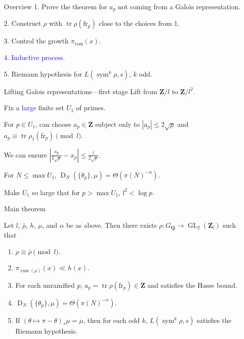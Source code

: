 \documentclass{beamer}
\DeclareMathOperator{\D}{D}
\DeclareMathOperator{\GL}{GL}
\DeclareMathOperator{\ram}{ram}
\DeclareMathOperator{\sym}{sym}
\DeclareMathOperator{\tr}{tr}
\newcommand{\bQ}{\mathbf{Q}}
\newcommand{\bZ}{\mathbf{Z}}
\newcommand{\frob}{\mathrm{fr}}
\begin{document}
\begin{frame}{Overview}
\color{shade}
1. Prove the theorem for $a_p$ not coming from a Galois representation.

2. Construct $\rho$ with $\tr\rho(\frob_p)$ close to the choices from 1.

3. Control the growth $\pi_{\ram}(x)$. 

\textcolor{blue}{
4. Inductive process.}

5. Riemann hypothesis for $L(\sym^k\rho,s)$, $k$ odd.
\end{frame}



\begin{frame}{Lifting Galois representations---first stage}
Lift from $\bZ/l$ to $\bZ/l^2$. 
\pause

Fix a \textcolor{blue}{large} finite set $U_1$ of primes. 
\pause

For $p\in U_1$, can choose $a_p\in \bZ$ subject only to 
$|a_p|\leqslant 2\sqrt p$ and $a_p\equiv \tr\rho_1(\frob_p)\pmod{l}$. 
\pause

We can ensure 
$\left| \frac{a_p}{2\sqrt p} - x_p\right| \leqslant \frac{l}{2\sqrt p}$.
\pause

For $N\leqslant \max U_1$, $\D_N(\{\theta_p\},\mu) = \Theta(\pi(N)^{-\alpha})$. 
\pause

Make $U_1$ so large that for $p>\max U_1$, $l^2 < \log p$. 
\end{frame}



\begin{frame}{Main theorem}
\begin{theorem}[M.]
Let $l$, $\bar\rho$, $h$, $\mu$, and $\alpha$ be as above. Then there exists 
$\rho\colon G_\bQ \to \GL_2(\bZ_l)$ such that 
\begin{enumerate}
\item
$\rho \equiv \bar\rho\pmod{l}$. 

\item
$\pi_{\ram(\rho)}(x) \ll h(x)$. 

\item
For each unramified $p$, $a_p = \tr \rho(\frob_p)\in \bZ$ and satisfies the 
Hasse bound.

\item
$\D_N(\{\theta_p\},\mu) = \Theta(\pi(N)^{-\alpha})$. 

\item
If $(\theta\mapsto \pi-\theta)_\ast \mu = \mu$, then for each odd $k$, 
$L(\sym^k \rho,s)$ satisfies the Riemann hypothesis. 
\end{enumerate}
\end{theorem}
\end{frame}
\end{document}
